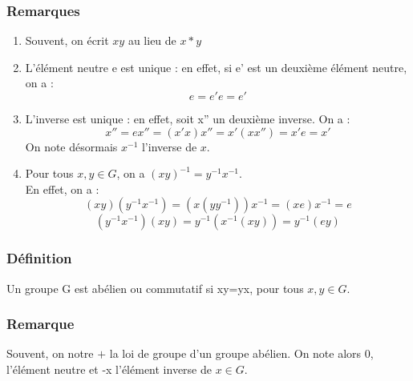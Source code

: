 \documentclass[a4paper, oneside]{report}
\begin{document}
\subsubsection{Remarques}
\begin{enumerate}
\item Souvent, on écrit $xy$ au lieu de $x*y$\\
\item L'élément neutre e est unique : en effet, si e' est un deuxième élément neutre, on a :
$$ e = e'e = e'$$
\item L'inverse est unique : en effet, soit x'' un deuxième inverse. On a :
$$x''=ex''=(x'x)x''=x'(xx'')=x'e=x'$$
On note désormais $x^{-1}$ l'inverse de $x$.\\
\item Pour tous $x,y\in G$, on a $(xy)^{-1}=y^{-1}x^{-1}$.\\
En effet, on a :
$$(xy)(y^{-1}x^{-1})=(x(yy^{-1}))x^{-1} = (xe)x^{-1}=e$$
$$(y^{-1}x^{-1})(xy)=y^{-1}(x^{-1}(xy))=y^{-1}(ey)$$
\end{enumerate}

\subsubsection{Définition}
Un groupe G est abélien ou commutatif si xy=yx, pour tous $x,y\in G$.

\subsubsection{Remarque}
Souvent, on notre $+$ la loi de groupe d'un groupe abélien. On note alors 0, l'élément neutre et -x l'élément inverse de $x\in G$.
\end{document}
